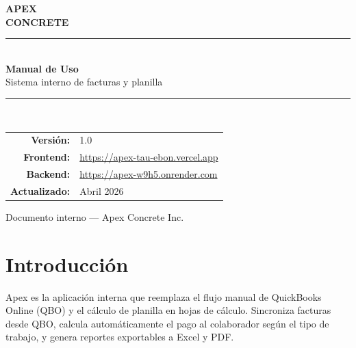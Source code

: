 \documentclass[11pt,a4paper]{article}
\title{}
\author{}
\date{}
\begin{document}
\begin{titlepage}
  \begin{center}
    \vspace*{2cm}
    {\Huge\bfseries\textcolor{apexorange}{APEX}}\\[0.3cm]
    {\Large\bfseries\textcolor{apexsteel}{CONCRETE}}\\[2cm]

    \rule{0.6\linewidth}{1pt}\\[0.5cm]
    {\LARGE\bfseries Manual de Uso}\\[0.3cm]
    {\large\textcolor{apexgray}{Sistema interno de facturas y planilla}}\\[0.3cm]
    \rule{0.6\linewidth}{1pt}\\[3cm]

    \begin{tabular}{rl}
      \textcolor{apexgray}{\textbf{Versión:}}    & 1.0 \\
      \textcolor{apexgray}{\textbf{Frontend:}}   & \url{https://apex-tau-ebon.vercel.app} \\
      \textcolor{apexgray}{\textbf{Backend:}}    & \url{https://apex-w9h5.onrender.com} \\
      \textcolor{apexgray}{\textbf{Actualizado:}}& Abril 2026 \\
    \end{tabular}

    \vfill
    \textcolor{apexgray}{\small Documento interno --- Apex Concrete Inc.}
  \end{center}
\end{titlepage}

\renewcommand*\contentsname{\textcolor{apexorange}{Contenido}}
\tableofcontents
\thispagestyle{fancy}
\newpage

\section{Introducción}

Apex es la aplicación interna que reemplaza el flujo manual de QuickBooks Online (QBO) y el cálculo de planilla en hojas de cálculo. Sincroniza facturas desde QBO, calcula automáticamente el pago al colaborador según el tipo de trabajo, y genera reportes exportables a Excel y PDF.
\end{document}
